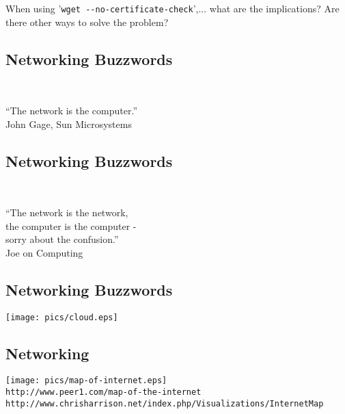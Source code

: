 \documentclass[xga]{xdvislides}
\begin{document}
When using '\verb+wget --no-certificate-check+',... what are the implications?
Are there other ways to solve the problem? \\


\subsection{Networking Buzzwords}
\\

\newcommand{\gargantuan}{\fontsize{45}{50}\selectfont}
\gargantuan
\begin{center}
``The network is the computer.'' \\
\small
\vspace*{.5in}
John Gage, Sun Microsystems
\end{center}
\Normalsize

\subsection{Networking Buzzwords}
\\

\gargantuan
\begin{center}
``The network is the network, \\
the computer is the computer - \\
sorry about the confusion.'' \\
\small
\vspace*{.5in}
Joe on Computing
\end{center}
\Normalsize

\subsection{Networking Buzzwords}
\vspace*{\fill}
\begin{center}
	\texttt{[image: pics/cloud.eps]}
\end{center}
\vspace*{\fill}

\subsection{Networking}
\vspace*{\fill}
\begin{center}
	\texttt{[image: pics/map-of-internet.eps]} \\
	\vspace*{\fill}
	\small
	\verb+http://www.peer1.com/map-of-the-internet+ \\
	\verb+http://www.chrisharrison.net/index.php/Visualizations/InternetMap+
	\Normalsize
\end{center}
\end{document}
